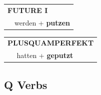 \documentclass[10pt,a4paper]{revtex4-2}
\begin{document}
\begin{verbbox-acc}
\begin{tabular}{rl}
    \multicolumn{2}{l}{\textbf{FUTURE I} }\\
  &  werden + \textbf{putzen}\\
 
  \end{tabular}
\hfill
   \begin{tabular}{rl}
      \multicolumn{2}{l}{\textbf{PLUSQUAMPERFEKT}}\\
   & hatten + \textbf{geputzt}\\
  \end{tabular}
  
  \vspace{-5pt}


\end{verbbox-acc}

\subsection{Q Verbs}
\end{document}
